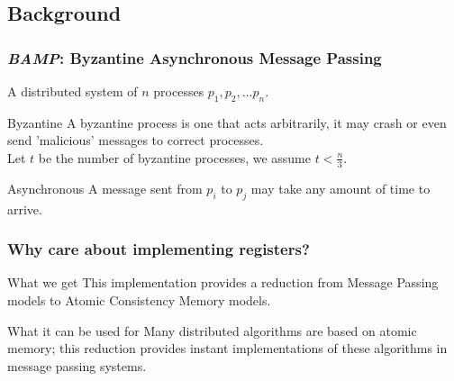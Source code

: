 \subsection{Background}
\begin{frame}
    \frametitle{\emph{BAMP}: Byzantine Asynchronous Message Passing}
    A distributed system of $n$ processes $p_1, p_2, ... p_n$.
    \begin{block}{Byzantine}
        A byzantine process is one that acts arbitrarily, it may crash or even
        send 'malicious' messages to correct processes.\\
        Let $t$ be the number of byzantine processes, we assume $t<\frac{n}{3}$.
    \end{block}
    \pause
    \begin{block}{Asynchronous}
        A message sent from $p_i$ to $p_j$ may take any amount of time to arrive.
    \end{block}
\end{frame}
\begin{frame}
    \frametitle{Why care about implementing registers?}
    \begin{block}{What we get}
        This implementation provides a reduction from Message Passing models to Atomic Consistency Memory models.
    \end{block}
    \begin{block}{What it can be used for}
        Many distributed algorithms are based on atomic memory; this reduction provides instant implementations
        of these algorithms in message passing systems.
    \end{block}
\end{frame}

